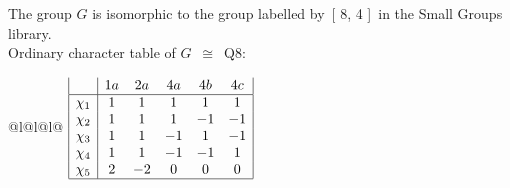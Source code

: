 \documentclass[varwidth=\maxdimen,border=10]{standalone}
\begin{document}
The group $G$ is isomorphic to the group labelled by\ [ 8, 4 ]\ in the Small Groups library.\\
Ordinary character table of $G$\ $\cong$\ Q8:\\
\begin{center}
\begin{tabular}{@{}l@{}l@{}l@{}}
\hline
\(\begin{array}{|l|ccccc|}
  & 1a & 2a & 4a & 4b & 4c\\ \hline
\chi_{1} & 1 & 1 & 1 & 1 & 1\\
\chi_{2} & 1 & 1 & 1 & -1 & -1\\
\chi_{3} & 1 & 1 & -1 & 1 & -1\\
\chi_{4} & 1 & 1 & -1 & -1 & 1\\
\chi_{5} & 2 & -2 & 0 & 0 & 0\\
\hline
\end{array}\)\\
\end{tabular}
\end{center}
\end{document}
